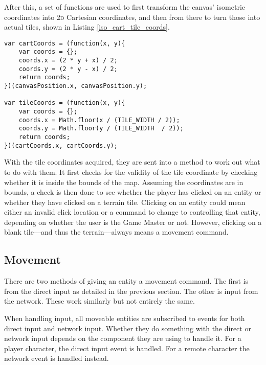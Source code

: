 After this, a set of functions are used to first transform the canvas' isometric coordinates into \textsc{2d} Cartesian coordinates, and then from there to turn those into actual tiles, shown in Listing \ref{iso_cart_tile_coords}.

\noindent
\begin{minipage}{\linewidth}
\begin{lstlisting}[style=js, caption={Turning the canvas isometric coordinates into \textsc{2d} Cartesian coordinates and then into tile positions. Original algorithm to transform isometric to Cartesian space from \cite{citeulike:13155325}.}, label=iso_cart_tile_coords]
var cartCoords = (function(x, y){
    var coords = {};
    coords.x = (2 * y + x) / 2;
    coords.y = (2 * y - x) / 2;
    return coords;
})(canvasPosition.x, canvasPosition.y);

var tileCoords = (function(x, y){
    var coords = {};
    coords.x = Math.floor(x / (TILE_WIDTH / 2));
    coords.y = Math.floor(y / (TILE_WIDTH  / 2));
    return coords;
})(cartCoords.x, cartCoords.y);
\end{lstlisting}
\end{minipage}

With the tile coordinates acquired, they are sent into a method to work out what to do with them. It first checks for the validity of the tile coordinate by checking whether it is inside the bounds of the map. Assuming the coordinates are in bounds, a check is then done to see whether the player has clicked on an entity or whether they have clicked on a terrain tile. Clicking on an entity could mean either an invalid click location or a command to change to controlling that entity, depending on whether the user is the Game Master or not. However, clicking on a blank tile---and thus the terrain---always means a movement command.

\subsection{Movement}
There are two methods of giving an entity a movement command. The first is from the direct input as detailed in the previous section. The other is input from the network. These work similarly but not entirely the same.

When handling input, all moveable entities are subscribed to events for both direct input and network input. Whether they do something with the direct or network input depends on the component they are using to handle it. For a player character, the direct input event is handled. For a remote character the network event is handled instead.

